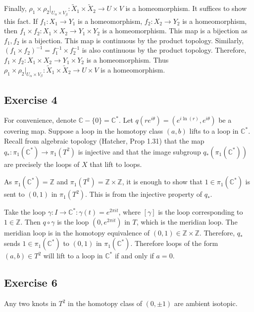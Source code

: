 \documentclass{article}
\theoremstyle{definition}
\numberwithin{theorem}{section}
\numberwithin{equation}{section}
\newcommand{\cover}{\widetilde{X}}
\begin{document}
Finally, $\rho_1 \times \rho_2 |_{U_\alpha \times V_\beta}: \cover_1 \times \cover_2 \rightarrow U \times V$ is a homeomorphism. It suffices to show this fact. If $f_1 : X_1 \rightarrow Y_1$ is a homeomorphism, $f_2 : X_2 \rightarrow Y_2$ is a homeomorphism, then $f_1 \times f_2 : X_1 \times X_2 \rightarrow Y_1 \times Y_2$ is a homeomorphism. This map is a bijection as $f_1, f_2$ is a bijection. This map is continuous by the product topology. Similarly,$(f_1 \times f_2 )^{-1} = f_1^{-1} \times f_2^{-1}$ is also continuous by the product topology. Therefore, $f_1 \times f_2 : X_1 \times X_2 \rightarrow Y_1 \times Y_2$ is a homeomorphism. Thus $\rho_1 \times \rho_2 |_{U_\alpha \times V_\beta}: \cover_1 \times \cover_2 \rightarrow U \times V$ is a homeomorphism. 

\subsection{Exercise 4}
For convenience, denote $\mathbb{C} - \{0\} = \mathbb{C}^*$. 
Let $q(r e^{i \theta}) = (e^{i \ln(r)}, e^{i \theta})$ be a covering map. Suppose a loop in the homotopy class $(a, b)$ lifts to a loop in $\mathbb{C}^*$. Recall from algebraic topology (Hatcher, Prop 1.31) that the map $q_* : \pi_1(\mathbb{C}^*) \rightarrow \pi_1(T^2)$ is injective and that the image subgroup $q_*(\pi_1(\mathbb{C}^*))$ are precisely the loops of $X$ that lift to loops.

As $\pi_1(\mathbb{C}^*) = \mathbb{Z}$ and $\pi_1(T^2) = \mathbb{Z} \times \mathbb{Z}$, it is enough to show that $1 \in \pi_1(\mathbb{C}^*)$ is sent to $(0, 1)$ in $\pi_1(T^2)$. This is from the injective property of $q_*$. 

Take the loop $\gamma : I \rightarrow \mathbb{C}^*: \gamma(t) = e^{2 \pi i t}$, where $[\gamma]$ is the loop corresponding to $1 \in \mathbb{Z}$. Then $q \circ \gamma$ is the loop $(0, e^{2 \pi i t})$ in $T$, which is the meridian loop. The meridian loop is in the homotopy equivalence of $(0,1) \in \mathbb{Z} \times \mathbb{Z}$. Therefore, $q_\ast$ sends $1 \in \pi_1(\mathbb{C}^*)$ to $(0, 1)$ in $\pi_1(\mathbb{C}^*)$. Therefore loops of the form $(a, b) \in T^2$ will lift to a loop in $\mathbb{C}^*$ if and only if $a = 0$.

\subsection{Exercise 6}

Any two knots in $T^2$ in the homotopy class of $(0, \pm 1)$ are ambient isotopic.
\end{document}
